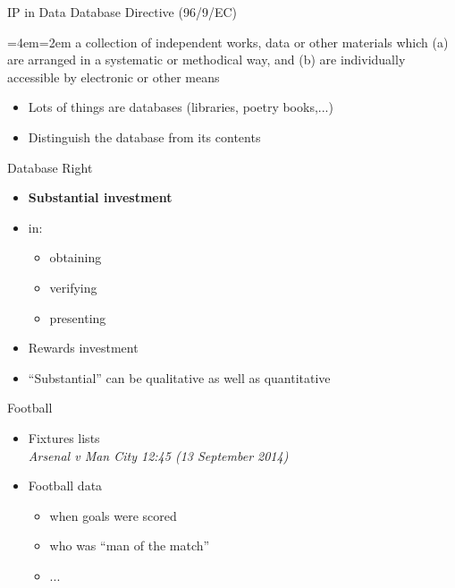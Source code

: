 \documentclass{beamer}
\newenvironment{blockquote}{%
  \par%
  \medskip
  \leftskip=4em\rightskip=2em%
  \noindent\ignorespaces}{%
  \par\medskip}
\begin{document}
\begin{frame}{IP in Data}
  Database Directive (96/9/EC)
  \begin{blockquote}
    a collection of independent works, data or other materials which (a)
are arranged in a systematic or methodical way, and (b) are individually
accessible by electronic or other means
  \end{blockquote}
  \begin{itemize}
  \item Lots of things are databases (libraries, poetry books,...)
  \item Distinguish the database from its contents
  \end{itemize}
\end{frame}

\begin{frame}{Database Right}
  \begin{itemize}
  \item {\bf Substantial investment}
  \item in:
    \begin{itemize}
    \item obtaining
    \item verifying
    \item presenting
    \end{itemize}
  \item Rewards investment
  \item ``Substantial'' can be qualitative as well as quantitative
  \end{itemize}
  
\end{frame}

\begin{frame}{Football}
  \begin{itemize}
  \item Fixtures lists \\
    {\it  Arsenal v Man City 12:45 (13 September 2014) }

\item Football data
  \begin{itemize}
  \item when goals were scored
  \item who was ``man of the match''
  \item ...
  \end{itemize}
  \end{itemize}
\end{frame}
\end{document}
